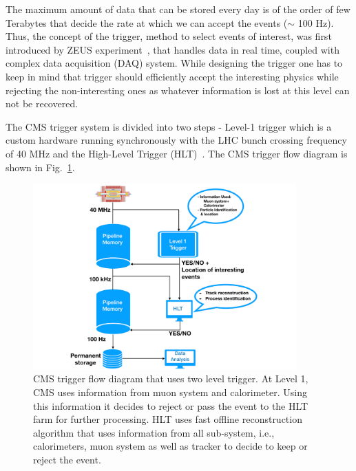 The maximum amount of data that can be stored every day is of the order of few Terabytes that decide the rate at which we can accept the events ($\sim$ 100 Hz).
Thus, the concept of the trigger, method to select events of interest, was first introduced by ZEUS experiment~\cite{ZEUSCollaboration1993}, that handles data in real time, coupled with complex data acquisition (DAQ) system.
While designing the trigger one has to keep in mind that trigger should efficiently accept the interesting physics  while rejecting the non-interesting ones as whatever information is lost at this level can not be recovered.

The CMS trigger system is divided into two steps - Level-1 trigger which is a custom hardware running synchronously with the LHC bunch crossing frequency of 40 MHz and the High-Level Trigger (HLT)~\cite{paper:JINST:CMSCollaboration,Cittolin:578006,Khachatryan2017}. The CMS trigger flow diagram is shown in Fig.~\ref{fig:cms-trigger}. 
\begin{figure}[!htbp]
	\centering
	\includegraphics[width=0.9\textwidth,height=0.63\textwidth]{figures/LHC/Trigger-flow-diagram.pdf}
	\caption{CMS trigger flow diagram that uses two level trigger. At Level 1, CMS uses information from muon system and calorimeter. Using this information it decides to reject  or pass the event to the HLT farm for further processing. HLT uses fast offline reconstruction algorithm that uses information from all sub-system, i.e., calorimeters, muon system as well as tracker to decide to keep or reject the event.}
	\label{fig:cms-trigger}
\end{figure}

